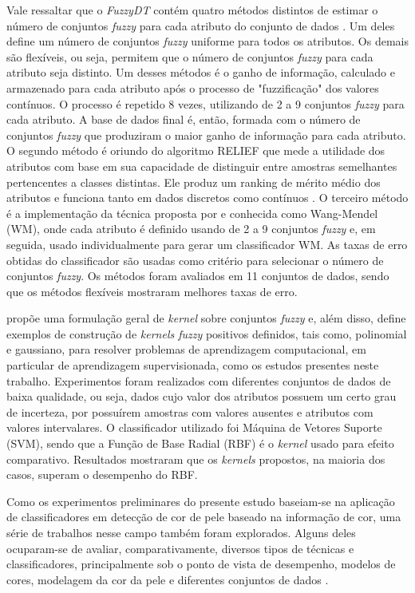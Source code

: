 Vale ressaltar que o \emph{FuzzyDT} contém quatro métodos distintos de estimar o número de conjuntos \emph{fuzzy} para cada atributo do conjunto de dados \citep{cintra:11}. Um deles define um número de conjuntos \emph{fuzzy} uniforme para todos os atributos. Os demais são flexíveis, ou seja, permitem que o número de conjuntos \emph{fuzzy} para cada atributo seja distinto. Um desses métodos é o ganho de informação, calculado e armazenado para cada atributo após o processo de "fuzzificação" dos valores contínuos. O processo é repetido 8 vezes, utilizando de 2 a 9 conjuntos \emph{fuzzy} para cada atributo. A base de dados final é, então, formada com o número de conjuntos \emph{fuzzy} que produziram o maior ganho de informação para cada atributo. O segundo método é oriundo do algoritmo RELIEF que mede a utilidade dos atributos com base em sua capacidade de distinguir entre amostras semelhantes pertencentes a classes distintas. Ele produz um ranking de mérito médio dos atributos e funciona tanto em dados discretos como contínuos \citep{kononenko:94}. O terceiro método é a implementação da técnica proposta por \citet{wang:03} e conhecida como Wang-Mendel (WM), onde cada atributo é definido usando de 2 a 9 conjuntos \emph{fuzzy} e, em seguida, usado individualmente para gerar um classificador WM. As taxas de erro obtidas do classificador são usadas como critério para selecionar o número de conjuntos \emph{fuzzy}. Os métodos foram avaliados em 11 conjuntos de dados, sendo que os métodos flexíveis mostraram melhores taxas de erro.

\citet{guevara:14} propõe uma formulação geral de \emph{kernel} sobre conjuntos \emph{fuzzy} e, além disso, define exemplos de construção de \emph{kernels fuzzy} positivos definidos, tais como, polinomial e gaussiano, para resolver problemas de aprendizagem computacional, em particular de aprendizagem supervisionada, como os estudos presentes neste trabalho. Experimentos foram realizados com diferentes conjuntos de dados de baixa qualidade, ou seja, dados cujo valor dos atributos possuem um certo grau de incerteza, por possuírem amostras com valores ausentes e atributos com valores intervalares. O classificador utilizado foi Máquina de Vetores Suporte (SVM), sendo que a Função de Base Radial (RBF) é o \emph{kernel} usado para efeito comparativo. Resultados mostraram que os \emph{kernels} propostos, na maioria dos casos, superam o desempenho do RBF.

Como os experimentos preliminares do presente estudo baseiam-se na aplicação de classificadores em detecção de cor de pele baseado na informação de cor, uma série de trabalhos nesse campo também foram explorados. Alguns deles ocuparam-se de avaliar, comparativamente, diversos tipos de técnicas e classificadores, principalmente sob o ponto de vista de desempenho, modelos de cores, modelagem da cor da pele e diferentes conjuntos de dados \citep{vezhnevets:03,kakumanu:07,mahmoodi:16}.


